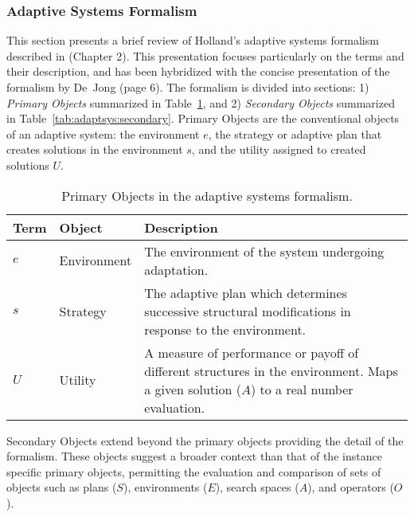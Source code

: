 \subsubsection{Adaptive Systems Formalism}
This section presents a brief review of Holland's adaptive systems formalism described in \cite{Holland1975} (Chapter 2). This presentation focuses particularly on the terms and their description, and has been hybridized with the concise presentation of the formalism by De~Jong \cite{Jong1975} (page 6). The formalism is divided into sections: 1) \emph{Primary Objects} summarized in Table~\ref{tab:adaptsys:primary}, and 2) \emph{Secondary Objects} summarized in Table~\ref{tab:adaptsys:secondary}. Primary Objects are the conventional objects of an adaptive system: the environment $e$, the strategy or adaptive plan that creates solutions in the environment $s$, and the utility assigned to created solutions $U$.

\begin{table}[ht]
	\centering\small
		\begin{tabularx}{\textwidth}{llX}
		\toprule
		\textbf{Term} & \textbf{Object} & \textbf{Description} \\ 
		\toprule
		$e$ & Environment & The environment of the system undergoing adaptation. \\ 
		\midrule
		$s$ & Strategy & The adaptive plan which determines successive structural modifications in response to the environment. \\ 
		\midrule
		$U$ & Utility & A measure of performance or payoff of different structures in the environment. Maps a given solution ($A$) to a real number evaluation. \\ 
		\bottomrule
		\end{tabularx}	
	\caption{Primary Objects in the adaptive systems formalism.}
	\label{tab:adaptsys:primary}
\end{table}

Secondary Objects extend beyond the primary objects providing the detail of the formalism. These objects suggest a broader context than that of the instance specific primary objects, permitting the evaluation and comparison of sets of objects such as plans ($S$), environments ($E$), search spaces ($A$), and operators ($O$).

